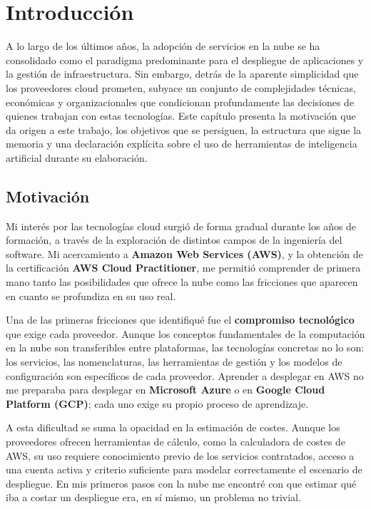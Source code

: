 \chapter{Introducción}\label{cap:introduccion}

A lo largo de los últimos años, la adopción de servicios en la nube se ha consolidado
como el paradigma predominante para el despliegue de aplicaciones y la gestión de
infraestructura. Sin embargo, detrás de la aparente simplicidad que los proveedores
cloud prometen, subyace un conjunto de complejidades técnicas, económicas y
organizacionales que condicionan profundamente las decisiones de quienes trabajan
con estas tecnologías. Este capítulo presenta la motivación que da origen a este
trabajo, los objetivos que se persiguen, la estructura que sigue la memoria y
una declaración explícita sobre el uso de herramientas de inteligencia artificial
durante su elaboración.

\section{Motivación}

Mi interés por las tecnologías cloud surgió de forma gradual durante los años de
formación, a través de la exploración de distintos campos de la ingeniería del
software. Mi acercamiento a \textbf{Amazon Web Services (AWS)}, y la obtención de
la certificación \textbf{AWS Cloud Practitioner}, me permitió comprender de primera
mano tanto las posibilidades que ofrece la nube como las fricciones que aparecen en
cuanto se profundiza en su uso real.

Una de las primeras fricciones que identifiqué fue el \textbf{compromiso tecnológico}
que exige cada proveedor. Aunque los conceptos fundamentales de la computación en
la nube son transferibles entre plataformas, las tecnologías concretas no lo son:
los servicios, las nomenclaturas, las herramientas de gestión y los modelos de
configuración son específicos de cada proveedor. Aprender a desplegar en AWS no
me preparaba para desplegar en \textbf{Microsoft Azure} o en \textbf{Google Cloud
Platform (GCP)}; cada uno exige su propio proceso de aprendizaje.

A esta dificultad se suma la opacidad en la estimación de costes. Aunque los
proveedores ofrecen herramientas de cálculo, como la calculadora de costes de
AWS, su uso requiere conocimiento previo de los servicios contratados, acceso a
una cuenta activa y criterio suficiente para modelar correctamente el escenario
de despliegue. En mis primeros pasos con la nube me encontré con que estimar qué
iba a costar un despliegue era, en sí mismo, un problema no trivial.


